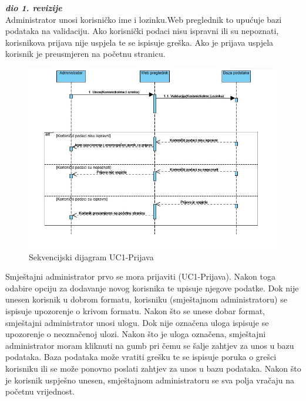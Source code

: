 				\textbf{\textit{dio 1. revizije}}\\
				{Administrator unosi korisničko ime i lozinku.Web preglednik to upućuje bazi podataka na validaciju. Ako korisnički podaci nisu ispravni ili su nepoznati, korisnikova prijava nije uspjela te se ispisuje greška. Ako je prijava uspjela korisnik je preusmjeren na početnu stranicu.}
				
				\begin{figure}[H]
					\includegraphics[width=\linewidth]{slike/DentAll_Sekvencijski-UC1-Prijava.jpeg} 
					\centering
					\caption{Sekvencijski dijagram UC1-Prijava}
					\label{fig:Sekvencijski dijagram UC1}
				\end{figure}
				
				\newpage
				
					
					{Smještajni administrator prvo se mora prijaviti (UC1-Prijava). Nakon toga odabire opciju za dodavanje novog korisnika te upisuje njegove podatke. Dok nije unesen korisnik u dobrom formatu, korisniku (smještajnom administratoru) se ispisuje upozorenje o krivom formatu. Nakon što se unese dobar format, smještajni administrator unosi ulogu. Dok nije označena uloga ispisuje se upozorenje o neoznačenoj ulozi. Nakon što je uloga označena, smještajni administrator moram kliknuti na gumb pri čemu se šalje zahtjev za unos u bazu podataka. Baza  podataka može vratiti grešku te se ispisuje poruka o grešci korisniku ili se može ponovno poslati zahtjev za unos u bazu podataka. Nakon što je korisnik uspješno unesen, smještajnom administratoru se sva polja vračaju na početnu vrijednost.}
				
